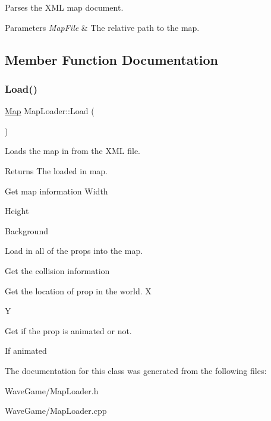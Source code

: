Parses the X\+ML map document. 


\begin{DoxyParams}{Parameters}
{\em Map\+File} & The relative path to the map.\\
\hline
\end{DoxyParams}


\subsection{Member Function Documentation}
\mbox{\label{class_map_loader_a9091d4af0b00a48ae7d9e8e1e46cd0fd}} 
\subsubsection{\texorpdfstring{Load()}{Load()}}
{\footnotesize\ttfamily \hyperlink{class_map}{Map} Map\+Loader\+::\+Load (\begin{DoxyParamCaption}{ }\end{DoxyParamCaption})}



Loads the map in from the X\+ML file. 

\begin{DoxyReturn}{Returns}
The loaded in map.
\end{DoxyReturn}
Get map information Width

Height

Background

Load in all of the props into the map.

Get the collision information

Get the location of prop in the world. X

Y

Get if the prop is animated or not.

If animated 

The documentation for this class was generated from the following files\+:\begin{DoxyCompactItemize}
\item 
Wave\+Game/Map\+Loader.\+h\item 
Wave\+Game/Map\+Loader.\+cpp\end{DoxyCompactItemize}

